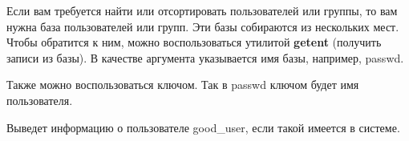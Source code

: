Если вам требуется найти или отсортировать пользователей или группы, то вам нужна база пользователей или групп. Эти базы собираются из нескольких мест. Чтобы обратится к ним, можно воспользоваться утилитой \textbf{getent} (получить записи из базы). В качестве аргумента указывается имя базы, например, passwd. 

Также можно воспользоваться ключом. Так в passwd ключом будет имя пользователя. 


Выведет информацию о пользователе good\_user, если такой имеется в системе. 